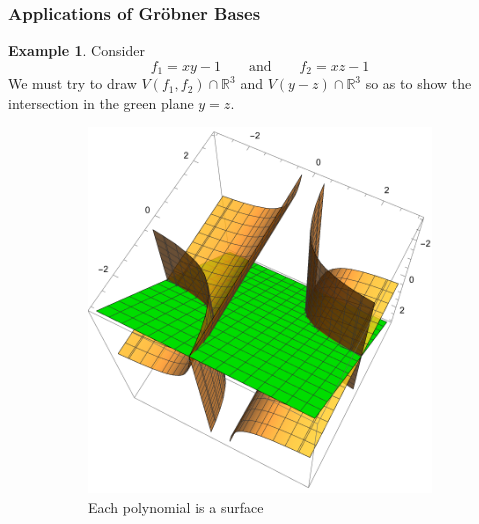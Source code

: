 \documentclass{article}
\theoremstyle{definition}
\newtheorem{ex}{Example}
\newcommand{\R}{\mathbb{R}}
\begin{document}
\subsubsection{Applications of Gröbner Bases}
\begin{ex}
	Consider
	$$f_1=xy-1\qquad\text{and}\qquad f_2=xz-1$$
	We must try to draw $V(f_1,f_2)\cap \R^3$ and $V(y-z)\cap\R^3$ so as to show the intersection in the green plane $y=z$.
	\begin{figure}[H]
	\begin{subfigure}{0.5\textwidth}
				\centering
		\includegraphics[width=1\linewidth]{12}
		\caption*{Each polynomial is a surface}
		\label{fig:12}
	\end{subfigure}
	\begin{subfigure}{0.5\textwidth}
		\centering

\end{subfigure}
\end{figure}
\end{ex}
\end{document}
